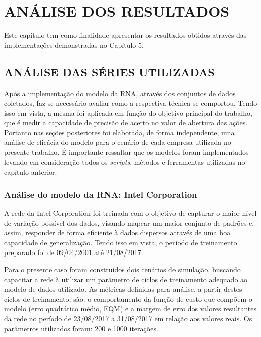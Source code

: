 
\chapter{ANÁLISE DOS RESULTADOS}\label{ch:resultados}
Este capítulo tem como finalidade apresentar os resultados obtidos através das implementações demonstradas no Capítulo 5.

\section{ANÁLISE DAS SÉRIES UTILIZADAS}
Após a implementação do modelo da RNA, através dos conjuntos de dados coletados, faz-se necessário avaliar como a respectiva técnica se comportou. Tendo isso em vista, a mesma foi aplicada em função do objetivo principal do trabalho, que é medir a capacidade de precisão de acerto no valor de abertura das ações. Portanto nas seções posteriores foi elaborada, de forma independente, uma análise de eficácia do modelo para o cenário de cada empresa utilizada no presente trabalho. É importante ressaltar que os modelos foram implementados levando em consideração todos os \textit{scripts}, métodos e ferramentas utilizadas no capítulo anterior.

\subsection{Análise do modelo da RNA: Intel Corporation}
A rede da Intel Corporation foi treinada com o objetivo de capturar o maior nível de variação possível dos dados, visando mapear um maior conjunto de padrões e, assim, responder de forma eficiente à dados dispersos através de uma boa capacidade de generalização. Tendo isso em vista, o período de treinamento preparado foi de 09/04/2001 até 21/08/2017.

Para o presente caso foram construídos dois cenários de simulação, buscando capacitar a rede à utilizar um parâmetro de ciclos de treinamento adequado ao modelo de dados utilizado. As métricas definidas para análise, a partir destes ciclos de treinamento, são: o comportamento da função de custo que compõem o modelo (erro quadrático médio, EQM) e a margem de erro dos valores resultantes da rede no período de 23/08/2017 a 31/08/2017 em relação aos valores reais. Os parâmetros utilizados foram: 200 e 1000 iterações.

